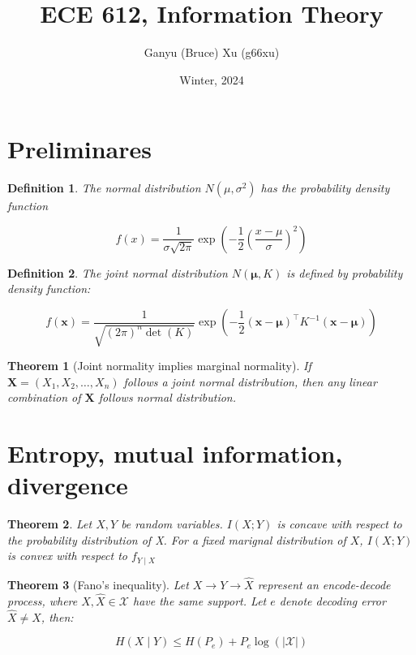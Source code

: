 \documentclass{article}
\title{ECE 612, Information Theory}
\author{Ganyu (Bruce) Xu (g66xu)}
\date{Winter, 2024}
\newcommand{\norm}[1]{\vert {#1} \vert}
\newtheorem{definition}{Definition}[section]
\newtheorem{theorem}{Theorem}[section]
\begin{document}
\maketitle

\section*{Preliminares}
\begin{definition}
    The normal distribution $N(\mu, \sigma^2)$ has the probability density function

    $$
    f(x) = \frac{1}{\sigma\sqrt{2\pi}}\exp(-\frac{1}{2}(\frac{x-\mu}{\sigma})^2)
    $$
\end{definition}

\begin{definition}
    The joint normal distribution $N(\mathbf{\mu}, K)$ is defined by probability density function:

    $$
    f(\mathbf{x}) = \frac{1}{\sqrt{(2\pi)^n\det(K)}}
    \exp(-\frac{1}{2}
        (\mathbf{x} - \mathbf{\mu})^\intercal
        K^{-1}
        (\mathbf{x} - \mathbf{\mu})
    )
    $$
\end{definition}

\begin{theorem}[Joint normality implies marginal normality]
    If $\mathbf{X} = (X_1, X_2, \ldots, X_n)$ follows a joint normal distribution, then any linear combination of $\mathbf{X}$ follows normal distribution.
\end{theorem}

\section{Entropy, mutual information, divergence}

\begin{theorem}
    Let $X, Y$ be random variables. $I(X; Y)$ is concave with respect to the probability distribution of X. For a fixed marignal distribution of $X$, $I(X; Y)$ is convex with respect to $f_{Y \mid X}$
\end{theorem}

\begin{theorem}[Fano's inequality]
    Let $X \rightarrow Y \rightarrow \hat{X}$ represent an encode-decode process, where $X, \hat{X} \in \mathcal{X}$ have the same support. Let $e$ denote decoding error $\hat{X} \neq X$, then:

    $$
    H(X \mid Y) \leq H(P_e) + P_e \log(\norm{\mathcal{X}})
    $$
\end{theorem}
\end{document}

